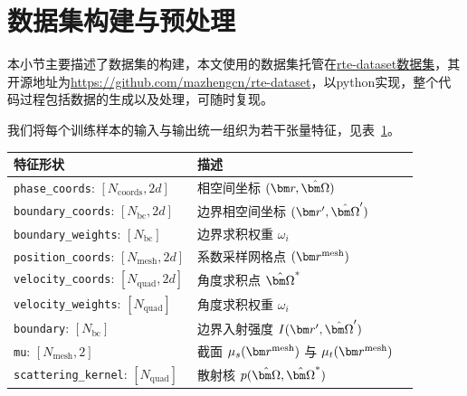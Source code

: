 \section{数据集构建与预处理}

本小节主要描述了数据集的构建，本文使用的数据集托管在\href{https://github.com/mazhengcn/rte-dataset}{rte-dataset数据集}，其开源地址为\url{https://github.com/mazhengcn/rte-dataset}，以python实现，整个代码过程包括数据的生成以及处理，可随时复现。

我们将每个训练样本的输入与输出统一组织为若干张量特征，见表~\ref{tab:rte_features}。

\begin{table}[!htp]
    \centering
    \begin{tabular}{lll}
        \toprule
        特征形状                                              & 描述                                                       \\
        \midrule
        \texttt{phase\_coords}: $[N_{\text{coords}},2d]$  & 相空间坐标 $(\br, \bOmega)$                                   \\
        \texttt{boundary\_coords}: $[N_{\text{bc}},2d]$   & 边界相空间坐标 $(\br^{\prime}, \bOmega^{\prime})$               \\
        \texttt{boundary\_weights}: $[N_{\text{bc}}]$     & 边界求积权重 $\omega_i$                                        \\
        \texttt{position\_coords}: $[N_{\text{mesh}},2d]$ & 系数采样网格点 $(\br^{\text{mesh}})$                            \\
        \texttt{velocity\_coords}: $[N_{\text{quad}},2d]$ & 角度求积点 $\bOmega^{*}$                                      \\
        \texttt{velocity\_weights}: $[N_{\text{quad}}]$   & 角度求积权重 $\omega_i$                                        \\
        \texttt{boundary}: $[N_{\text{bc}}]$              & 边界入射强度 $I(\br^{\prime}, \bOmega^{\prime})$               \\
        \texttt{mu}: $[N_{\text{mesh}},2]$                & 截面 $\mus(\br^{\text{mesh}})$ 与 $\mut(\br^{\text{mesh}})$ \\
        \texttt{scattering\_kernel}: $[N_{\text{quad}}]$  & 散射核 $p(\bOmega, \bOmega^*)$                              \\
        \bottomrule
    \end{tabular}
    \label{tab:rte_features}
\end{table}

